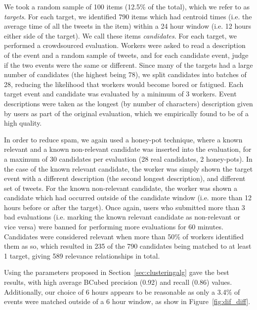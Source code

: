 We took a random sample of 100 items (12.5\% of the total), which we refer to as \emph{targets}.
For each target, we identified 790 items which had centroid times (i.e. the average time of all the tweets in the item) within a 24 hour window (i.e. 12 hours either side of the target).
We call these items \emph{candidates}.
For each target, we performed a crowdsourced evaluation. Workers were asked to read a description of the event and a random sample of tweets, and for each candidate event, judge if the two events were the same or different.
Since many of the targets had a large number of candidates (the highest being 78), we split candidates into batches of 28, reducing the likelihood that workers would become bored or fatigued.
Each target event and candidate was evaluated by a minimum of 3 workers.
Event descriptions were taken as the longest (by number of characters) description given by users as part of the original evaluation, which we empirically found to be of a high quality.

In order to reduce spam, we again used a honey-pot technique, where a known relevant and a known non-relevant candidate was inserted into the evaluation, for a maximum of 30 candidates per evaluation (28 real candidates, 2 honey-pots).
In the case of the known relevant candidate, the worker was simply shown the target event with a different description (the second longest description), and different set of tweets.
For the known non-relevant candidate, the worker was shown a candidate which had occurred outside of the candidate window (i.e. more than 12 hours before or after the target).
Once again, users who submitted more than 3 bad evaluations (i.e. marking the known relevant candidate as non-relevant or vice versa) were banned for performing more evaluations for 60 minutes.
Candidates were considered relevant when more than 50\% of workers identified them as so, which resulted in 235 of the 790 candidates being matched to at least 1 target, giving 589 relevance relationships in total.

Using the parameters proposed in Section~\ref{sec:clusteringalg} gave the best results, with high average BCubed precision (0.92) and recall (0.86) values.
Additionally, our choice of 6 hours appears to be reasonable as only a 3.4\% of events were matched outside of a 6 hour window, as show in Figure~\ref{fig:dif_diff}.

